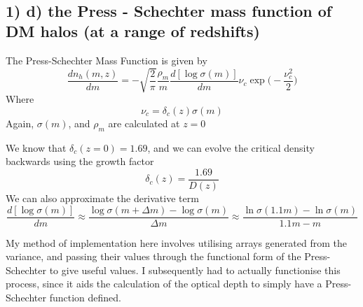 \documentclass[11pt]{article}
\begin{document}
    \begin{center}
    \end{center}
    { \hspace*{\fill} \\}
    
    \subsection{1) d) the Press - Schechter mass function of DM halos (at a
range of
redshifts)}\label{d-the-press---schechter-mass-function-of-dm-halos-at-a-range-of-redshifts}

The Press-Schechter Mass Function is given by
\[\frac{d n_h (m,z)}{dm} = - \sqrt{\frac{2}{\pi}} \frac{\rho_m}{m} \frac{d[\log{\sigma(m)}]}{dm} \nu_c \exp\Big(-\frac{\nu_c^2}{2} \Big)\]
Where \[\nu_c = \delta_c (z) \sigma(m) \] Again, \(\sigma(m)\), and
\(\rho_m\) are calculated at \(z=0\)

We know that \(\delta_c(z=0) = 1.69\), and we can evolve the critical
density backwards using the growth factor
\[ \delta_c(z) = \frac{1.69}{D(z)}\] We can also approximate the
derivative term
\[\frac{d[\log{\sigma(m)}]}{dm} \approx \frac{\log\sigma(m+\Delta m) - \log\sigma(m)}{\Delta m} \approx \frac{\ln\sigma(1.1m) - \ln\sigma(m)}{1.1m-m}\]

My method of implementation here involves utilising arrays generated
from the variance, and passing their values through the functional form
of the Press-Schechter to give useful values. I subsequently had to
actually functionise this process, since it aids the calculation of the
optical depth to simply have a Press-Schechter function defined.
\end{document}
